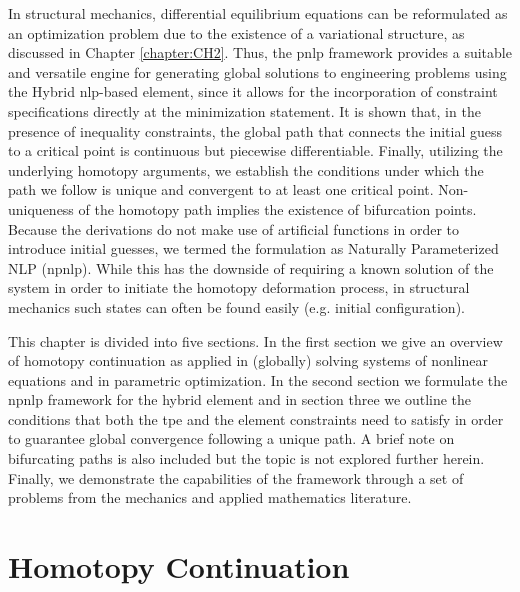 In structural mechanics, differential equilibrium equations can be reformulated 
as an optimization problem due to the existence of a variational structure, as 
discussed in Chapter \ref{chapter:CH2}. Thus, the \acrshort{pnlp} framework 
provides a suitable and versatile engine for generating global solutions to 
engineering problems using the Hybrid 
\acrshort{nlp}-based element, since it allows for the incorporation of 
constraint
specifications directly at the minimization statement. It is shown that, in the 
presence of inequality constraints, the global path that connects the initial 
guess to a critical point is continuous but piecewise 
differentiable\cite{Kojima:1984,Guddat:1990,Gfrerer:1985}. Finally, utilizing 
the underlying 
homotopy arguments, we establish the conditions under which the path we follow 
is unique and convergent to at least one critical point. Non-uniqueness of the 
homotopy path implies the existence of bifurcation points. Because the 
derivations do not make use of artificial functions in order to introduce 
initial guesses, we termed the formulation as Naturally Parameterized NLP 
(\acrshort{npnlp}). While this has the downside of requiring a known solution 
of the system in order to initiate the homotopy deformation process, in 
structural mechanics such states can often be found easily (e.g. initial 
configuration).

This chapter is divided into five sections. In the first section we give an 
overview of homotopy continuation as applied in (globally) solving systems of 
nonlinear equations and in parametric optimization. In the second section we
formulate the \acrshort{npnlp} framework for the hybrid element and in section 
three we outline the conditions that both the \acrshort{tpe} and the element 
constraints need to satisfy in order to guarantee global convergence following 
a unique path. A brief note on bifurcating paths is also included but the topic 
is not explored further herein. Finally, we demonstrate the capabilities of the 
framework through a set of problems from the 
mechanics and applied mathematics literature.

\section{Homotopy Continuation}\label{CH4-S1}

